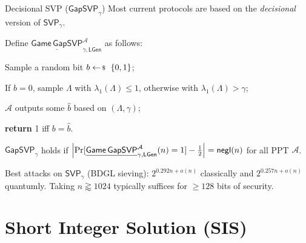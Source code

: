\documentclass{zkdl-presentation-template}
\begin{document}
    \begin{frame}{Decisional SVP ($\mathsf{GapSVP}_{\gamma}$)}
        Most current protocols are based on the \textit{decisional} version of $\mathsf{SVP}_{\gamma}$.
        \begin{definition}
            Define $\underline{\mathsf{Game}\,\mathsf{GapSVP}}^{\mathcal{A}}_{\gamma,\mathsf{LGen}}$ as follows:
            \begin{algoen}
                \item Sample a random bit $b \leftarrowS \{0,1\}$;
                \item If $b=0$, sample $\Lambda$ with $\lambda_1(\Lambda) \leq 1$, otherwise with $\lambda_1(\Lambda) > \gamma$;
                \item $\mathcal{A}$ outputs some $\widehat{b}$ based on $(\Lambda,\gamma)$;
                \item \textbf{return} 1 iff $b=\widehat{b}$.
            \end{algoen}
            $\mathsf{GapSVP}_{\gamma}$ holds if $\left|\Pr[\underline{\mathsf{Game}\,\mathsf{GapSVP}}^{\mathcal{A}}_{\gamma,\mathsf{LGen}}(n) = 1] - \frac{1}{2}\right| = \mathsf{negl}(n)$ for all PPT $\mathcal{A}$.
        \end{definition}
        \pause

        \begin{remark}
            Best attacks on $\mathsf{SVP}_{\gamma}$ (BDGL sieving): $2^{0.292n+o(n)}$ classically and $2^{0.257n+o(n)}$ quantumly. Taking $n \gtrapprox 1024$ typically suffices for $\geq 128$ bits of security.
        \end{remark}
    \end{frame}

    \section{Short Integer Solution (SIS)}
\end{document}
